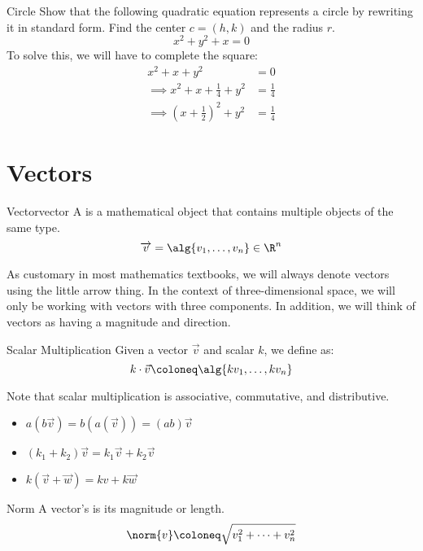 \documentclass[12pt]{report}
\begin{document}
\begin{exbox}{Circle}{}
    Show that the following quadratic equation represents a circle by rewriting it in standard form. Find the center $c = (h,k)$ and the radius $r$.
    \[ x^2 + y^2 + x = 0 \]
    \tcblower
    To solve this, we will have to complete the square:
    \begin{align*}
        x^2 + x + y^2 &= 0 \\
        \implies x^2 + x + \frac{1}{4} + y^2 &= \frac{1}{4} \\
        \implies \left( x + \frac12 \right)^2 + y^2 &= \frac14
    \end{align*}
\end{exbox}

\section{Vectors}

\begin{dfnbox}{Vector}{vector}
    A  is a mathematical object that contains multiple objects of the same type.
    \tcblower
    \[ \overrightarrow{v} = \alg{v_1, \ldots, v_n} \in \R^n \]
\end{dfnbox}

As customary in most mathematics textbooks, we will always denote vectors using the little arrow thing. In the context of three-dimensional space, we will only be working with vectors with three components. In addition, we will think of vectors as having a magnitude and direction.

\begin{dfnbox}{Scalar Multiplication}{}
    Given a vector $\vec{v}$ and scalar $k$, we define  as:
    \[ k \cdot \vec{v} \coloneq \alg{kv_1, \ldots, kv_n} \]
\end{dfnbox}

Note that scalar multiplication is associative, commutative, and distributive.
\begin{itemize}
    \item $a(b\vec{v}) = b(a(\vec{v})) = (ab) \vec{v}$
    \item $(k_1 + k_2) \vec{v} = k_1 \vec{v} + k_2 \vec{v}$
    \item $k (\vec{v} + \vec{w}) = k{v} + k\vec{w}$
\end{itemize}

\begin{dfnbox}{Norm}{}
    A vector's  is its magnitude or length.
    \tcblower
    \[ \norm{v} \coloneq \sqrt{v_1^2 + \cdots + v_n^2} \]
\end{dfnbox}
\end{document}
